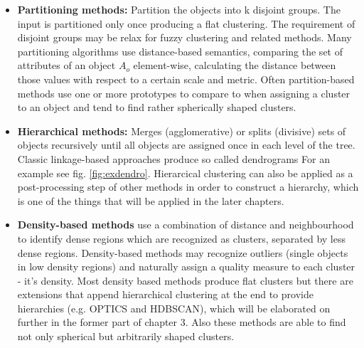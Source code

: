 \begin{itemize}
    \item \textbf{Partitioning methods:} Partition the objects into k disjoint groups. The input is partitioned only once producing a flat clustering. The requirement of disjoint groups may be relax for fuzzy clustering and related methods. Many partitioning algorithms use distance-based semantics, comparing the set of attributes of an object $A_{o}$ element-wise, calculating the distance between those values with respect to a certain scale and metric. Often partition-based methods use one or more prototypes to compare to when assigning a cluster to an object and tend to find rather spherically shaped clusters. \\
    
    \item \textbf{Hierarchical methods:} Merges (agglomerative) or splits (divisive) sets of objects recursively until all objects are assigned once in each level of the tree. Classic linkage-based approaches produce so called dendrograms  For an example see fig. \ref{fig:exdendro}. Hierarcical clustering can also be applied as a post-processing step of other methods in order to construct a hierarchy, which is one of the things that will be applied in the later chapters. \\
    
    \item \textbf{Density-based methods} use a combination of distance and neighbourhood to identify dense regions which are recognized as clusters, separated by less dense regions. Density-based methods may recognize outliers (single objects in low density regions) and naturally assign a quality measure to each cluster - it's density. Most density based methods produce flat clusters but there are extensions that append hierarchical clustering at the end to provide hierarchies (e.g. OPTICS and HDBSCAN), which will be elaborated on further in the former part of chapter 3. Also these methods are able to find not only spherical but arbitrarily shaped clusters.  \\
    

\end{itemize}
